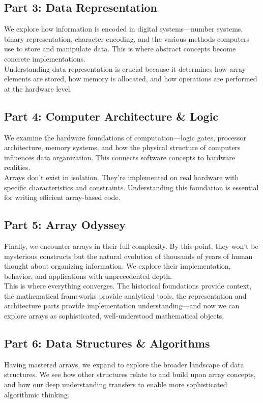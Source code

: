 \subsection*{Part 3: Data Representation}
We explore how information is encoded in digital systems—number systems, binary representation, character encoding, and the various methods computers use to store and manipulate data. This is where abstract concepts become concrete implementations.\\

Understanding data representation is crucial because it determines how array elements are stored, how memory is allocated, and how operations are performed at the hardware level.

\subsection*{Part 4: Computer Architecture \& Logic}
We examine the hardware foundations of computation—logic gates, processor architecture, memory systems, and how the physical structure of computers influences data organization. This connects software concepts to hardware realities.\\

Arrays don't exist in isolation. They're implemented on real hardware with specific characteristics and constraints. Understanding this foundation is essential for writing efficient array-based code.

\subsection*{Part 5: Array Odyssey}
Finally, we encounter arrays in their full complexity. By this point, they won't be mysterious constructs but the natural evolution of thousands of years of human thought about organizing information. We explore their implementation, behavior, and applications with unprecedented depth.\\

This is where everything converges. The historical foundations provide context, the mathematical frameworks provide analytical tools, the representation and architecture parts provide implementation understanding—and now we can explore arrays as sophisticated, well-understood mathematical objects.

\subsection*{Part 6: Data Structures \& Algorithms}
Having mastered arrays, we expand to explore the broader landscape of data structures. We see how other structures relate to and build upon array concepts, and how our deep understanding transfers to enable more sophisticated algorithmic thinking.

